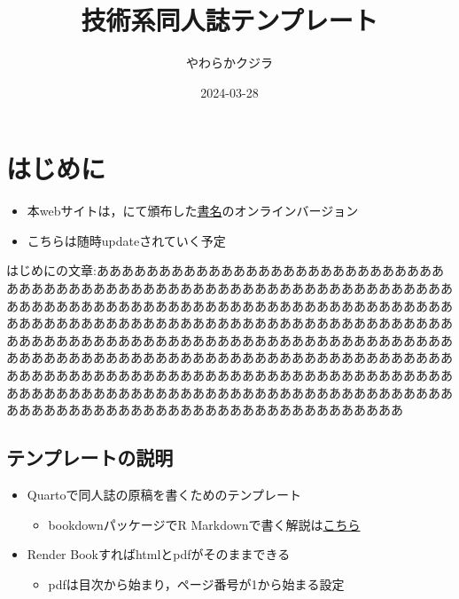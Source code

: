 \documentclass[
  b5paper,
  xelatex, ja=standard]{bxjsbook}
\title{技術系同人誌テンプレート}
\author{やわらかクジラ}
\date{2024-03-28}
\providecommand{\tightlist}{%
  \setlength{\itemsep}{0pt}\setlength{\parskip}{0pt}}\usepackage{longtable,booktabs,array}
\renewcommand*\contentsname{Table of contents}
\newcommand\contentsname{Table of contents}
\begin{document}
\maketitle

\renewcommand*\contentsname{目次}
{
\hypersetup{linkcolor=}
\setcounter{tocdepth}{2}
\tableofcontents
}

\chapter*{はじめに}\label{ux306fux3058ux3081ux306b}


\begin{itemize}
\tightlist
\item
  本webサイトは，にて頒布した\href{url}{書名}のオンラインバージョン
\item
  こちらは随時updateされていく予定
\end{itemize}

はじめにの文章:ああああああああああああああああああああああああああああああああああああああああああああああああああああああああああああああああああああああああああああああああああああああああああああああああああああああああああああああああああああああああああああああああああああああああああああああああああああああああああああああああああああああああああああああああああああああああああああああああああああああああああああああああああああああああああああああああああああああああああああああああああああああああああああああああああああああああああああああああああああああああああああああああああああああああああああああああああああああああ

\section*{テンプレートの説明}\label{ux30c6ux30f3ux30d7ux30ecux30fcux30c8ux306eux8aacux660e}


\begin{itemize}
\item
  Quartoで同人誌の原稿を書くためのテンプレート

  \begin{itemize}
  \tightlist
  \item
    bookdownパッケージでR
    Markdownで書く解説は\href{https://izunyan.github.io/dojinshi-template-rmd/}{こちら}
  \end{itemize}
\item
  Render Bookすればhtmlとpdfがそのままできる

  \begin{itemize}
  \tightlist
  \item
    pdfは目次から始まり，ページ番号が1から始まる設定
  \end{itemize}
\end{itemize}
\end{document}

